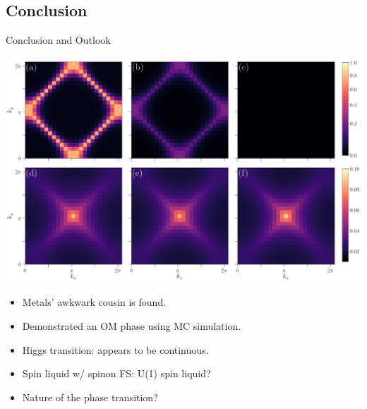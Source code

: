 \documentclass[xcolor=table, 10pt, aspectratio=43]{beamer}
\begin{document}
\subsection{Conclusion}
\begin{frame}{Conclusion and Outlook}
\begin{center}
	\includegraphics[width=.6\textwidth]{../orthogonal_metal/fig2}
\end{center}
\begin{itemize}
\item Metals' awkwark cousin is found.
\item Demonstrated an OM phase using MC simulation.
\item Higgs transition: appears to be continuous.
\item Spin liquid w/ spinon FS: U(1) spin liquid?
\item Nature of the phase transition?
\end{itemize}
\end{frame}
\end{document}
